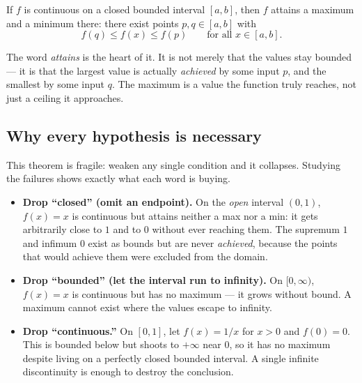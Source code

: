 \begin{theorem}
\label{ch08:thm-evt}
If $f$ is continuous on a closed bounded interval $[a,b]$, then $f$ attains a maximum and a
minimum there: there exist points $p,q\in[a,b]$ with
\[
  f(q)\le f(x)\le f(p)\qquad\text{for all } x\in[a,b].
\]
\end{theorem}

The word \emph{attains} is the heart of it. It is not merely that the values stay bounded
--- it is that the largest value is actually \emph{achieved} by some input $p$, and the
smallest by some input $q$. The maximum is a value the function truly reaches, not just a
ceiling it approaches.

\subsection{Why every hypothesis is necessary}

This theorem is fragile: weaken any single condition and it collapses. Studying the
failures shows exactly what each word is buying.

\begin{itemize}
  \item \textbf{Drop ``closed'' (omit an endpoint).} On the \emph{open} interval $(0,1)$,
        $f(x)=x$ is continuous but attains neither a max nor a min: it gets arbitrarily
        close to $1$ and to $0$ without ever reaching them. The supremum $1$ and infimum
        $0$ exist as bounds but are never \emph{achieved}, because the points that would
        achieve them were excluded from the domain.
  \item \textbf{Drop ``bounded'' (let the interval run to infinity).} On $[0,\infty)$,
        $f(x)=x$ is continuous but has no maximum --- it grows without bound. A maximum
        cannot exist where the values escape to infinity.
  \item \textbf{Drop ``continuous.''} On $[0,1]$, let $f(x)=1/x$ for $x>0$ and $f(0)=0$.
        This is bounded below but shoots to $+\infty$ near $0$, so it has no maximum despite
        living on a perfectly closed bounded interval. A single infinite discontinuity is
        enough to destroy the conclusion.
\end{itemize}

